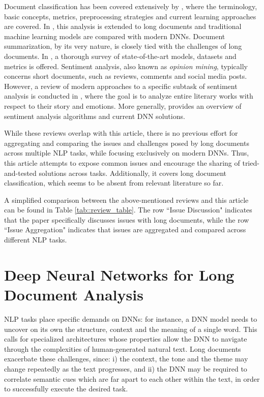 \documentclass[preprint,review,10pt]{elsarticle}
\begin{document}
	Document classification has been covered extensively by \cite{kowasari}, where the terminology, basic concepts, metrics, preprocessing strategies and current learning approaches are covered. In \cite{wagh}, this analysis is extended to long documents and traditional machine learning models are compared with modern DNNs. Document summarization, by its very nature, is closely tied with the challenges of long documents. In \cite{koh}, a thorough survey of state-of-the-art models, datasets and metrics is offered. Sentiment analysis, also known as \textit{opinion mining}, typically concerns short documents, such as reviews, comments and social media posts. However, a review of modern approaches to a specific subtask of sentiment analysis is conducted in \cite{omori}, where the goal is to analyze entire literary works with respect to their story and emotions. More generally, \cite{poon} provides an overview of sentiment analysis algorithms and current DNN solutions.
	
	While these reviews overlap with this article, there is no previous effort for aggregating and comparing the issues and challenges posed by long documents across multiple NLP tasks, while focusing exclusively on modern DNNs. Thus, this article attempts to expose common issues and encourage the sharing of tried-and-tested  solutions across tasks. Additionally, it covers long document classification, which seems to be absent from relevant literature so far.
	
	A simplified comparison between the above-mentioned reviews and this article can be found in Table \ref{tab::review_table}. The row ``Issue Discussion" indicates that the paper specifically discusses issues with long documents, while the row ``Issue Aggregation" indicates that issues are aggregated and compared across different NLP tasks.
	
	\section{Deep Neural Networks for Long Document Analysis}
	\label{sec::DNNs}
	NLP tasks place specific demands on DNNs: for instance, a DNN model needs to uncover on its own the structure, context and the meaning of a single word. This calls for specialized architectures whose properties allow the DNN to navigate through the complexities of human-generated natural text. Long documents exacerbate these challenges, since: i) the context, the tone and the theme may change repeatedly as the text progresses, and ii) the DNN may be required to correlate semantic cues which are far apart to each other within the text, in order to successfully execute the desired task.
	
\end{document}
